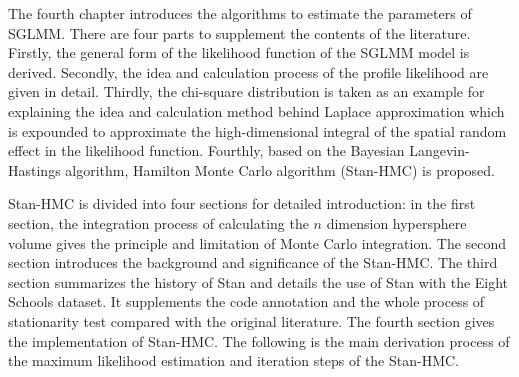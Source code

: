 \documentclass[12pt,a4paper,UTF8,twoside]{book}
\begin{document}
The fourth chapter introduces the algorithms to estimate the parameters
of SGLMM. There are four parts to supplement the contents of the
literature. Firstly, the general form of the likelihood function of the
SGLMM model is derived. Secondly, the idea and calculation process of
the profile likelihood are given in detail. Thirdly, the chi-square
distribution is taken as an example for explaining the idea and
calculation method behind Laplace approximation which is expounded to
approximate the high-dimensional integral of the spatial random effect
in the likelihood function. Fourthly, based on the Bayesian
Langevin-Hastings algorithm, Hamilton Monte Carlo algorithm (Stan-HMC)
is proposed.

Stan-HMC is divided into four sections for detailed introduction: in the
first section, the integration process of calculating the \(n\)
dimension hypersphere volume gives the principle and limitation of Monte
Carlo integration. The second section introduces the background and
significance of the Stan-HMC. The third section summarizes the history
of Stan and details the use of Stan with the Eight Schools dataset. It
supplements the code annotation and the whole process of stationarity
test compared with the original literature. The fourth section gives the
implementation of Stan-HMC. The following is the main derivation process
of the maximum likelihood estimation and iteration steps of the
Stan-HMC.
\end{document}
